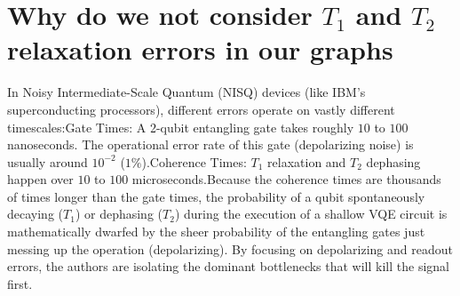 \documentclass[11pt]{article}
\begin{document}
\section{Why do we not consider $T_1$ and $T_2$ relaxation errors in our graphs}

In Noisy Intermediate-Scale Quantum (NISQ) devices (like IBM's superconducting processors), different errors operate on vastly different timescales:Gate Times: A 2-qubit entangling gate takes roughly $10$ to $100$ nanoseconds. The operational error rate of this gate (depolarizing noise) is usually around $10^{-2}$ ($1\%$).Coherence Times: $T_1$ relaxation and $T_2$ dephasing happen over $10$ to $100$ microseconds.Because the coherence times are thousands of times longer than the gate times, the probability of a qubit spontaneously decaying ($T_1$) or dephasing ($T_2$) during the execution of a shallow VQE circuit is mathematically dwarfed by the sheer probability of the entangling gates just messing up the operation (depolarizing). By focusing on depolarizing and readout errors, the authors are isolating the dominant bottlenecks that will kill the signal first.
\end{document}
